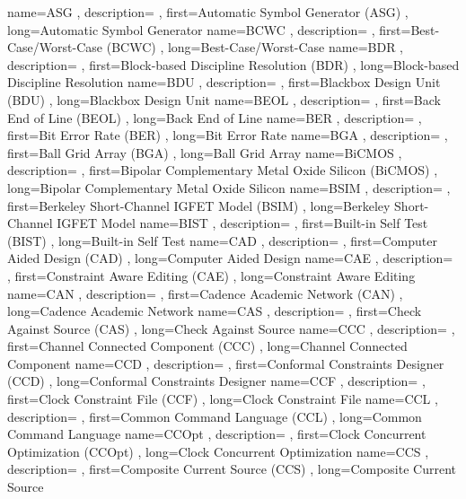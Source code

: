 { name={ASG}
, description={}
, first={Automatic Symbol Generator (ASG)}
, long={Automatic Symbol Generator}
}
{ name={BCWC}
, description={}
, first={Best-Case/Worst-Case (BCWC)}
, long={Best-Case/Worst-Case}
}
{ name={BDR}
, description={}
, first={Block-based Discipline Resolution (BDR)}
, long={Block-based Discipline Resolution}
}
{ name={BDU}
, description={}
, first={Blackbox Design Unit (BDU)}
, long={Blackbox Design Unit}
}
{ name={BEOL}
, description={}
, first={Back End of Line (BEOL)}
, long={Back End of Line}
}
{ name={BER}
, description={}
, first={Bit Error Rate (BER)}
, long={Bit Error Rate}
}
{ name={BGA}
, description={}
, first={Ball Grid Array (BGA)}
, long={Ball Grid Array}
}
{ name={BiCMOS}
, description={}
, first={Bipolar Complementary Metal Oxide Silicon (BiCMOS)}
, long={Bipolar Complementary Metal Oxide Silicon}
}
{ name={BSIM}
, description={}
, first={Berkeley Short-Channel IGFET Model (BSIM)}
, long={Berkeley Short-Channel IGFET Model}
}
{ name={BIST}
, description={}
, first={Built-in Self Test (BIST)}
, long={Built-in Self Test}
}
{ name={CAD}
, description={}
, first={Computer Aided Design (CAD)}
, long={Computer Aided Design}
}
{ name={CAE}
, description={}
, first={Constraint Aware Editing (CAE)}
, long={Constraint Aware Editing}
}
{ name={CAN}
, description={}
, first={Cadence Academic Network (CAN)}
, long={Cadence Academic Network}
}
{ name={CAS}
, description={}
, first={Check Against Source (CAS)}
, long={Check Against Source}
}
{ name={CCC}
, description={}
, first={Channel Connected Component (CCC)}
, long={Channel Connected Component}
}
{ name={CCD}
, description={}
, first={Conformal Constraints Designer (CCD)}
, long={Conformal Constraints Designer}
}
{ name={CCF}
, description={}
, first={Clock Constraint File (CCF)}
, long={Clock Constraint File}
}
{ name={CCL}
, description={}
, first={Common Command Language (CCL)}
, long={Common Command Language}
}
{ name={CCOpt}
, description={}
, first={Clock Concurrent Optimization (CCOpt)}
, long={Clock Concurrent Optimization}
}
{ name={CCS}
, description={}
, first={Composite Current Source (CCS)}
, long={Composite Current Source}
}
